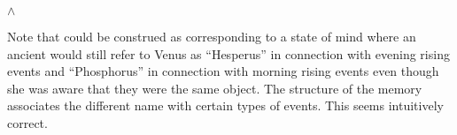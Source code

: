 \begin{ex} 
\begin{subex} 
 
\item {}\d{$\wedge$} 
 
\item {} 
 
\end{subex} 
   
\end{ex} 
Note that \preveg{} could be construed as corresponding to a state of
mind where an ancient would still refer to Venus as ``Hesperus'' in
connection with evening rising events and ``Phosphorus'' in connection with morning rising
events even though she was
aware that they were the same object.  The structure of the memory
associates the different name with certain types of events.  This
seems intuitively correct.

